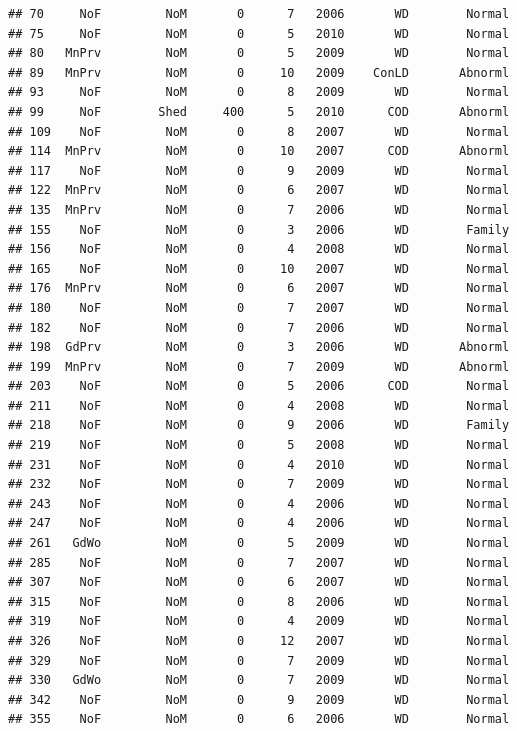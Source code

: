\documentclass[]{article}
\begin{document}
\begin{verbatim}
## 70     NoF         NoM       0      7   2006       WD        Normal
## 75     NoF         NoM       0      5   2010       WD        Normal
## 80   MnPrv         NoM       0      5   2009       WD        Normal
## 89   MnPrv         NoM       0     10   2009    ConLD       Abnorml
## 93     NoF         NoM       0      8   2009       WD        Normal
## 99     NoF        Shed     400      5   2010      COD       Abnorml
## 109    NoF         NoM       0      8   2007       WD        Normal
## 114  MnPrv         NoM       0     10   2007      COD       Abnorml
## 117    NoF         NoM       0      9   2009       WD        Normal
## 122  MnPrv         NoM       0      6   2007       WD        Normal
## 135  MnPrv         NoM       0      7   2006       WD        Normal
## 155    NoF         NoM       0      3   2006       WD        Family
## 156    NoF         NoM       0      4   2008       WD        Normal
## 165    NoF         NoM       0     10   2007       WD        Normal
## 176  MnPrv         NoM       0      6   2007       WD        Normal
## 180    NoF         NoM       0      7   2007       WD        Normal
## 182    NoF         NoM       0      7   2006       WD        Normal
## 198  GdPrv         NoM       0      3   2006       WD       Abnorml
## 199  MnPrv         NoM       0      7   2009       WD       Abnorml
## 203    NoF         NoM       0      5   2006      COD        Normal
## 211    NoF         NoM       0      4   2008       WD        Normal
## 218    NoF         NoM       0      9   2006       WD        Family
## 219    NoF         NoM       0      5   2008       WD        Normal
## 231    NoF         NoM       0      4   2010       WD        Normal
## 232    NoF         NoM       0      7   2009       WD        Normal
## 243    NoF         NoM       0      4   2006       WD        Normal
## 247    NoF         NoM       0      4   2006       WD        Normal
## 261   GdWo         NoM       0      5   2009       WD        Normal
## 285    NoF         NoM       0      7   2007       WD        Normal
## 307    NoF         NoM       0      6   2007       WD        Normal
## 315    NoF         NoM       0      8   2006       WD        Normal
## 319    NoF         NoM       0      4   2009       WD        Normal
## 326    NoF         NoM       0     12   2007       WD        Normal
## 329    NoF         NoM       0      7   2009       WD        Normal
## 330   GdWo         NoM       0      7   2009       WD        Normal
## 342    NoF         NoM       0      9   2009       WD        Normal
## 355    NoF         NoM       0      6   2006       WD        Normal

\end{verbatim}
\end{document}
